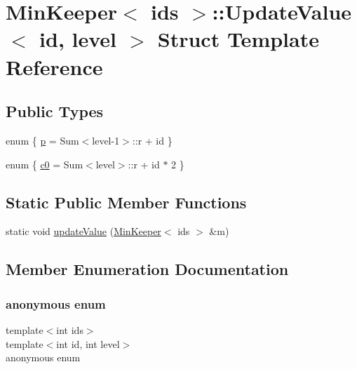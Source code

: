 \hypertarget{structMinKeeper_1_1UpdateValue}{}\section{Min\+Keeper$<$ ids $>$\+:\+:Update\+Value$<$ id, level $>$ Struct Template Reference}
\label{structMinKeeper_1_1UpdateValue}
\subsection*{Public Types}
\begin{DoxyCompactItemize}
\item 
enum \{ \hyperlink{structMinKeeper_1_1UpdateValue_a5d6decf8514ae657b1b3974d467e444aacad478e677b830939b65f4e94a1f1fb4}{p} = Sum$<$level-\/1$>$\+:\+:r + id
 \}
\item 
enum \{ \hyperlink{structMinKeeper_1_1UpdateValue_abe9a82edd5630679aabcccf219dd30e9ad532d8b4e4e288b811c1c09ec9b639fa}{c0} = Sum$<$level$>$\+:\+:r + id $\ast$ 2
 \}
\end{DoxyCompactItemize}
\subsection*{Static Public Member Functions}
\begin{DoxyCompactItemize}
\item 
static void \hyperlink{structMinKeeper_1_1UpdateValue_a8da2235016719c006fa07bcc1edc3478}{update\+Value} (\hyperlink{classMinKeeper}{Min\+Keeper}$<$ ids $>$ \&m)
\end{DoxyCompactItemize}


\subsection{Member Enumeration Documentation}
\mbox{\label{structMinKeeper_1_1UpdateValue_a5d6decf8514ae657b1b3974d467e444a}} 
\subsubsection{\texorpdfstring{anonymous enum}{anonymous enum}}
{\footnotesize\ttfamily template$<$int ids$>$ \\
template$<$int id, int level$>$ \\
anonymous enum}

